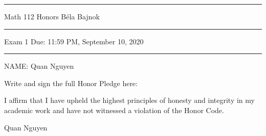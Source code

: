 \documentclass[12pt]{article}
\begin{document}
\hrule
\vspace{.2cm}

{\Large \noindent Math 112 Honors
\hfill
B\'ela Bajnok}

\vspace{.3cm}
\hrule

{\Large \noindent 
Exam 1
\hfill
Due: 11:59 PM, September 10, 2020}

\vspace{.3cm}
\hrule

\noindent NAME:  Quan Nguyen

\noindent \hrulefill\rule{0pt}{4pt}

\noindent Write and sign the full Honor Pledge here:

\vspace{2mm}

I affirm that I have upheld the highest principles of honesty and integrity in my academic work and have not witnessed a violation of the Honor Code.\par
\par
Quan Nguyen

\vspace{8mm}

\noindent \hrulefill\rule{0pt}{4pt}

\end{document}
